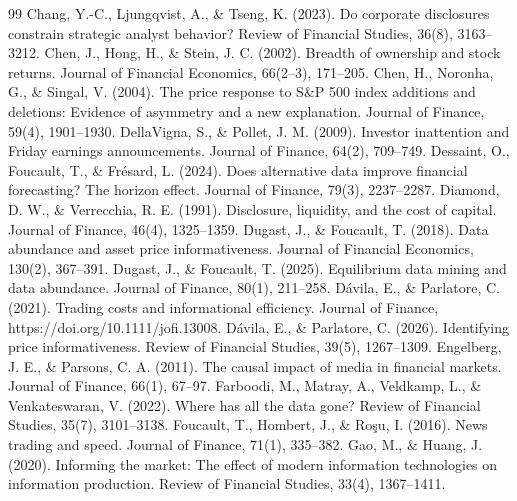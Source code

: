 \documentclass[a4paper,11pt]{ctexart}
\begin{document}
\begin{thebibliography}{99}
 Chang, Y.-C., Ljungqvist, A., \& Tseng, K. (2023). Do corporate disclosures constrain strategic analyst behavior? Review of Financial Studies, 36(8), 3163–3212.
 Chen, J., Hong, H., \& Stein, J. C. (2002). Breadth of ownership and stock returns. Journal of Financial Economics, 66(2–3), 171–205.
 Chen, H., Noronha, G., \& Singal, V. (2004). The price response to S\&P 500 index additions and deletions: Evidence of asymmetry and a new explanation. Journal of Finance, 59(4), 1901–1930.
 DellaVigna, S., \& Pollet, J. M. (2009). Investor inattention and Friday earnings announcements. Journal of Finance, 64(2), 709–749.
 Dessaint, O., Foucault, T., \& Frésard, L. (2024). Does alternative data improve financial forecasting? The horizon effect. Journal of Finance, 79(3), 2237–2287.
 Diamond, D. W., \& Verrecchia, R. E. (1991). Disclosure, liquidity, and the cost of capital. Journal of Finance, 46(4), 1325–1359.
 Dugast, J., \& Foucault, T. (2018). Data abundance and asset price informativeness. Journal of Financial Economics, 130(2), 367–391.
 Dugast, J., \& Foucault, T. (2025). Equilibrium data mining and data abundance. Journal of Finance, 80(1), 211–258.
 Dávila, E., \& Parlatore, C. (2021). Trading costs and informational efficiency. Journal of Finance, https://doi.org/10.1111/jofi.13008.
 Dávila, E., \& Parlatore, C. (2026). Identifying price informativeness. Review of Financial Studies, 39(5), 1267–1309.
 Engelberg, J. E., \& Parsons, C. A. (2011). The causal impact of media in financial markets. Journal of Finance, 66(1), 67–97.
 Farboodi, M., Matray, A., Veldkamp, L., \& Venkateswaran, V. (2022). Where has all the data gone? Review of Financial Studies, 35(7), 3101–3138.
 Foucault, T., Hombert, J., \& Roşu, I. (2016). News trading and speed. Journal of Finance, 71(1), 335–382.
 Gao, M., \& Huang, J. (2020). Informing the market: The effect of modern information technologies on information production. Review of Financial Studies, 33(4), 1367–1411.

\end{thebibliography}
\end{document}
